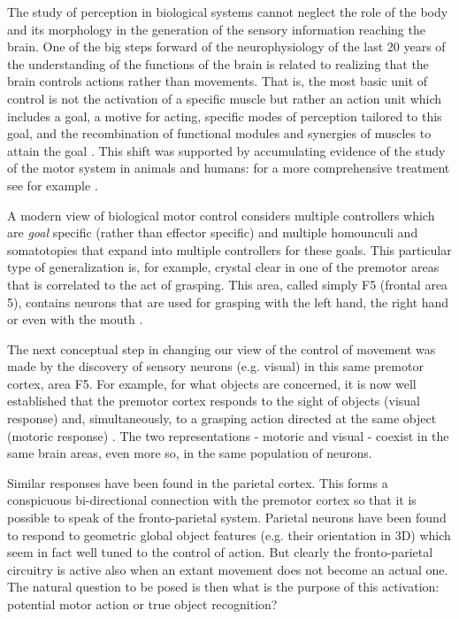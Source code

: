 The study of perception in biological systems cannot neglect the role
of the body and its morphology in the generation of the sensory information reaching the brain. One of the big steps forward of the neurophysiology of the last 20 years of 
the understanding of the functions of the brain 
is related to realizing that the brain controls actions rather than 
movements. That is, the most basic unit of control is not the activation 
of a specific muscle but rather an action unit which includes a goal, a 
motive for acting, specific modes of perception tailored to this goal, and the
recombination of functional modules and synergies of muscles to attain
the goal \cite{vonhoftsen04tics}. This shift was supported by accumulating evidence of the study of the motor system in animals and humans: for a more comprehensive treatment see for example \cite{rizzolatti88book, rizzolatti04review}. 

A modern view of biological motor control considers multiple controllers
which are {\em goal} specific (rather than effector specific) and multiple
homounculi and somatotopies that expand into multiple controllers for 
these goals. This particular type of generalization is, for example, 
crystal clear in one of the premotor areas that is correlated to the act 
of grasping. This area, called simply F5 (frontal area 5), contains neurons 
that are used for grasping with the left hand, the right hand or even with the 
mouth \cite{gallese96brain}. 
 
The next conceptual step in changing our view of the control of movement 
was made by the discovery of sensory neurons (e.g. visual) in this same
premotor cortex, area F5. For example, for what objects are concerned, 
it is now well established that the premotor cortex responds to the sight 
of objects (visual response) and, simultaneously, 
to a grasping action directed at the same object (motoric response) \cite{gallese96brain}. The two 
representations - motoric and visual - coexist in the same brain areas, 
even more so, in the same population of neurons.

Similar responses have been found in the parietal cortex. This forms a 
conspicuous bi-directional connection with the premotor cortex so that it 
is possible to speak of the fronto-parietal system. Parietal neurons have been 
found to respond to geometric global object features (e.g. their orientation 
in 3D) which seem in fact well tuned to the control of action. But clearly 
the fronto-parietal circuitry is active also when an extant movement does 
not become an actual one. The natural question to be posed is then what is 
the purpose of this activation: potential motor action or true object 
recognition?

